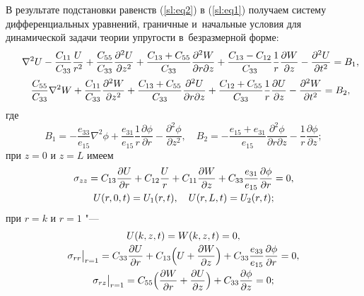 В результате подстановки равенств (\ref{sl:eq2}) в (\ref{sl:eq1}) получаем систему дифференциальных уравнений, граничные и~начальные условия для динамической задачи теории упругости в~безразмерной форме:
\begin{equation}
\label{sl:eq8} \hspace{-1mm}
\begin{array}{c}
\displaystyle
\nabla ^2U-\frac{C_{11} }{C_{33} }\frac{U}{r^2}+\frac{C_{55} }{C_{33}}\frac{\partial ^2U}{\partial z^2}+\frac{C_{13} + C_{55}}{C_{33} }
\frac{\partial ^2W}{\partial r\partial z}+\frac{C_{13} -C_{12}}{C_{33} }\frac{1}{r}\frac{\partial W}{\partial z}-
\frac{\partial ^2U}{\partial t^2}=B_1 , \vspace{2mm}
\\ 
\displaystyle
\frac{C_{55} }{C_{33} }\nabla ^2W+\frac{C_{11} }{C_{33} }\frac{\partial ^2W}{\partial z^2}+\frac{C_{13} +C_{55} }{C_{33} }
\frac{\partial ^2U}{\partial r\partial z}+\frac{C_{12} +C_{55}}{C_{33} }\frac{1}{r}\frac{\partial U}{\partial z}-\frac{\partial ^2W}{\partial t^2}=B_2 , 
\end{array} \hspace{-6mm}
\end{equation}
где
$$B_1 =-\frac{e_{33} }{e_{15} }\nabla ^2\phi +\frac{e_{31} }{e_{15} 
}\frac{1}{r}\frac{\partial \phi }{\partial r}-\frac{\partial ^2\phi 
}{\partial z^2} ,\quad  B_2 =-\frac{e_{15} +e_{31} }{e_{15} }\frac{\partial 
^2\phi }{\partial r\partial z}-\frac{1}{r}\frac{\partial \phi }{\partial 
z};$$
при $z=0$ и $z=L$ имеем
\begin{equation}
\label{sl:eq9}
\begin{array}{c}
\displaystyle
\sigma _{zz} =C_{13} \frac{\partial U}{\partial r}+C_{12} \frac{U}{r}+C_{11} \frac{\partial W}{\partial z}+C_{33} \frac{e_{31} }{e_{15} }\frac{\partial \phi }{\partial r}=0, \vspace{1mm}
\\
U(r, 0, t)=U_1 (r,  t), \quad U(r, L,  t)=U_2 (r,  t);
\end{array}
\end{equation}
при $r=k$ и $r= 1$ "---
\begin{equation}
\label{sl:eq10}
\begin{array}{c}
U(k, z,  t)=W(k, z,  t)=0, \vspace{1mm}
\\
\displaystyle
\sigma _{rr} \big|_{r=1} =C_{33} \frac{\partial U}{\partial r}+C_{13} \Bigl(U+\frac{\partial W}{\partial z} \Bigr)+
C_{33} \frac{e_{33} }{e_{15}}\frac{\partial \phi }{\partial r}=0, 
\vspace{1mm}
\\
\displaystyle
\sigma _{rz}\big|_{r=1} =C_{55} \Bigl(\frac{\partial W}{\partial r}+\frac{\partial U}{\partial z} \Bigr)+C_{33} \frac{\partial \phi }{\partial z}=0;
\end{array}
\end{equation}

